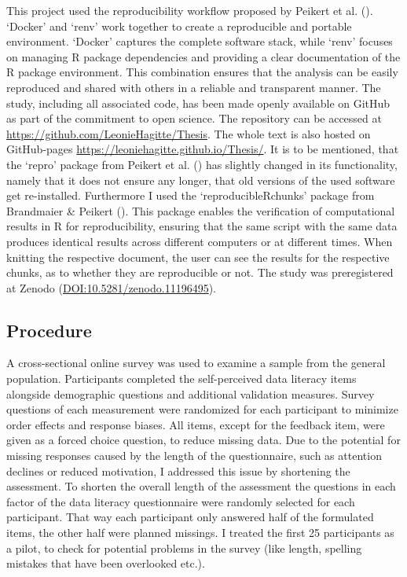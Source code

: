 \documentclass[
  12pt,
  a4paper,
  twoside]{article}
\begin{document}
This project used the reproducibility workflow proposed by Peikert et al. (). `Docker' and `renv' work together to create a reproducible and portable environment. `Docker' captures the complete software stack, while `renv' focuses on
managing R package dependencies and providing a clear documentation of the R
package environment. This combination ensures that the analysis can be easily
reproduced and shared with others in a reliable and transparent manner.
The study, including all associated code, has been made openly available on GitHub as part of the commitment to open science. The repository can be accessed at \url{https://github.com/LeonieHagitte/Thesis}.
The whole text is also hosted on GitHub-pages \url{https://leoniehagitte.github.io/Thesis/}.
It is to be mentioned, that the `repro' package from Peikert et al. () has slightly changed in its functionality, namely that it does not ensure any longer, that old versions of the used software get re-installed. Furthermore I used the `reproducibleRchunks' package from Brandmaier \& Peikert (). This package enables the verification of computational results in R for reproducibility, ensuring that the same script with the same data produces identical results across different computers or at different times. When knitting the respective document, the user can see the results for the respective chunks, as to whether they are reproducible or not.
The study was preregistered at Zenodo (\url{DOI:10.5281/zenodo.11196495}).

\subsection{Procedure}\label{procedure}

A cross-sectional online survey was used to examine a sample from the general population. Participants completed the self-perceived data literacy items alongside demographic questions and additional validation measures. Survey questions of each measurement were randomized for each participant to minimize order effects and response biases. All items, except for the feedback item, were given as a forced choice question, to reduce missing data. Due to the potential for missing responses caused by the length of the questionnaire, such as attention declines or reduced motivation, I addressed this issue by shortening the assessment. To shorten the overall length of the assessment the questions in each factor of the data literacy questionnaire were randomly selected for each participant. That way each participant only answered half of the formulated items, the other half were planned missings. I treated the first 25 participants as a pilot, to check for potential problems in the survey (like length, spelling mistakes that have been overlooked etc.).
\end{document}
